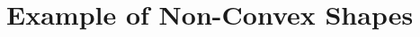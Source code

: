 \documentclass[12pt, titlepage, reqno]{article}
\newcommand{\pz}[1]{\textcolor{purple}{(PZ: #1)}}
\begin{document}
%
%
%
%
%
%


\section{Example of Non-Convex Shapes}
\label{app:convex}
\end{document}
